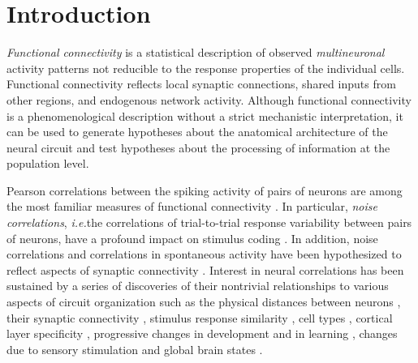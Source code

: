 \documentclass[10pt]{article}
\newcommand{\ie}{\emph{i.e.}\;}
\begin{document}
\section*{Introduction}
\emph{Functional connectivity} is a statistical description of observed \emph{multineuronal} activity patterns not reducible to the response properties of the individual cells. Functional connectivity reflects local synaptic connections, shared inputs from other regions, and endogenous network activity. Although functional connectivity is a phenomenological description without a strict mechanistic interpretation, it can be used to generate hypotheses about the anatomical architecture of the neural circuit and test hypotheses about the processing of information at the population level. 

Pearson correlations between the spiking activity of pairs of neurons are among the most familiar measures of functional connectivity \cite{Averbeck:2006, Zohary:1994, Kohn:2005, Bair:2001, Ecker:2010}.  In particular, \emph{noise correlations}, \ie the correlations of trial-to-trial response variability between pairs of neurons, have a profound impact on stimulus coding \cite{Zohary:1994, Abbott:1999, Sompolinsky:2001, Nirenberg:2003, Averbeck:2006, Josic:2009, Berens:2011, Ecker:2011}. In addition, noise correlations and correlations in spontaneous activity have been hypothesized to reflect aspects of synaptic connectivity \cite{Gerstein:1964}.  Interest in neural correlations has been sustained by a series of discoveries of their nontrivial relationships to various aspects of circuit organization such as the physical distances between neurons \cite{Smith:2008, Denman:2013}, their synaptic connectivity \cite{Ko:2011},  stimulus response similarity \cite{Bair:2001, Arieli:1995, Chiu:2002, Kenet:2003, Kohn:2005, Cohen:2008, Cohen:2009, Ecker:2010, Rothschild:2010, Ko:2011, Smith:2013b}, cell types \cite{Hofer:2011}, cortical layer specificity \cite{Hansen:2012, Smith:2013}, progressive changes in development and in learning \cite{Golshani:2009, Gu:2011, Ko:2013}, changes due to sensory stimulation and global brain states \cite{Greenberg:2008, Goard:2009, Kohn:2009, Rothschild:2010, Ecker:2010, Renart:2010}. 
\end{document}
